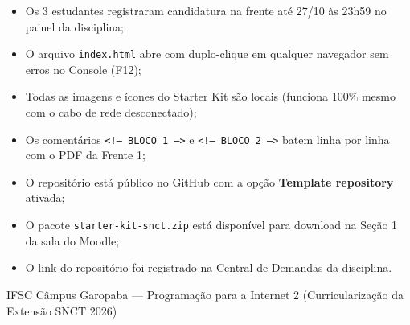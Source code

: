 \begin{checklist}
\begin{itemize}[label={\caixaMarcar}, itemsep=0.35em]
  \item Os 3 estudantes registraram candidatura na frente até 27/10 às 23h59 no painel da disciplina;
  \item O arquivo \texttt{index.html} abre com duplo-clique em qualquer navegador sem erros no Console (F12);
  \item Todas as imagens e ícones do Starter Kit são locais (funciona 100\% mesmo com o cabo de rede desconectado);
  \item Os comentários \texttt{<!-- BLOCO 1 -->} e \texttt{<!-- BLOCO 2 -->} batem linha por linha com o PDF da Frente 1;
  \item O repositório está público no GitHub com a opção \textbf{Template repository} ativada;
  \item O pacote \texttt{starter-kit-snct.zip} está disponível para download na Seção 1 da sala do Moodle;
  \item O link do repositório foi registrado na Central de Demandas da disciplina.
\end{itemize}
\end{checklist}

\vfill
{\centering\footnotesize\color{suave}\faMapMarkerAlt\hspace{0.4em}IFSC Câmpus Garopaba — Programação para a Internet 2 (Curricularização da Extensão SNCT 2026)\par}
